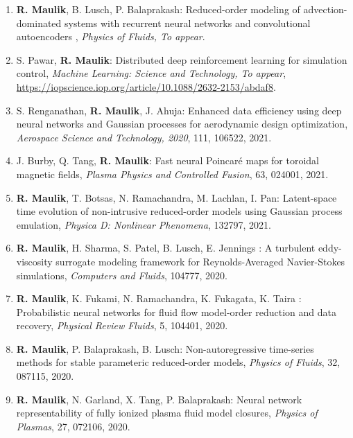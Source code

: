 \documentclass[letterpaper]{article}
\begin{document}
\begin{enumerate}

\item \textbf{R. Maulik}, B. Lusch, P. Balaprakash: Reduced-order modeling of advection-dominated systems with recurrent neural networks and convolutional autoencoders , {\it Physics of Fluids, To appear}.

\item S. Pawar, \textbf{R. Maulik}: Distributed deep reinforcement learning for simulation control, {\it Machine Learning: Science and Technology, To appear}, \url{https://iopscience.iop.org/article/10.1088/2632-2153/abdaf8}.

\item S. Renganathan, \textbf{R. Maulik}, J. Ahuja: Enhanced data efficiency using deep neural networks and Gaussian processes for aerodynamic design optimization, {\it Aerospace Science and Technology, 2020}, 111, 106522, 2021.

\item J. Burby, Q. Tang, \textbf{R. Maulik}: Fast neural Poincar\'{e} maps for toroidal magnetic fields, {\it Plasma Physics and Controlled Fusion}, 63, 024001, 2021.

\item \textbf{R. Maulik}, T. Botsas, N. Ramachandra, M. Lachlan, I. Pan: Latent-space time evolution of non-intrusive reduced-order models using Gaussian process emulation, {\it Physica D: Nonlinear Phenomena}, 132797, 2021. 

\item \textbf{R. Maulik}, H. Sharma, S. Patel, B. Lusch, E. Jennings : A turbulent eddy-viscosity surrogate modeling framework for Reynolds-Averaged Navier-Stokes simulations, {\it Computers and Fluids}, 104777, 2020. 

\item \textbf{R. Maulik}, K. Fukami, N. Ramachandra, K. Fukagata, K. Taira : Probabilistic neural networks for fluid flow model-order reduction and data recovery, {\it Physical Review Fluids}, 5, 104401, 2020. 

\item \textbf{R. Maulik}, P. Balaprakash, B. Lusch: Non-autoregressive time-series methods for stable parameteric reduced-order models, {\it Physics of Fluids}, 32, 087115, 2020. 

\item \textbf{R. Maulik}, N. Garland, X. Tang, P. Balaprakash: Neural network representability of fully ionized plasma fluid model closures, {\it Physics of Plasmas}, 27, 072106, 2020.


\end{enumerate}
\end{document}
